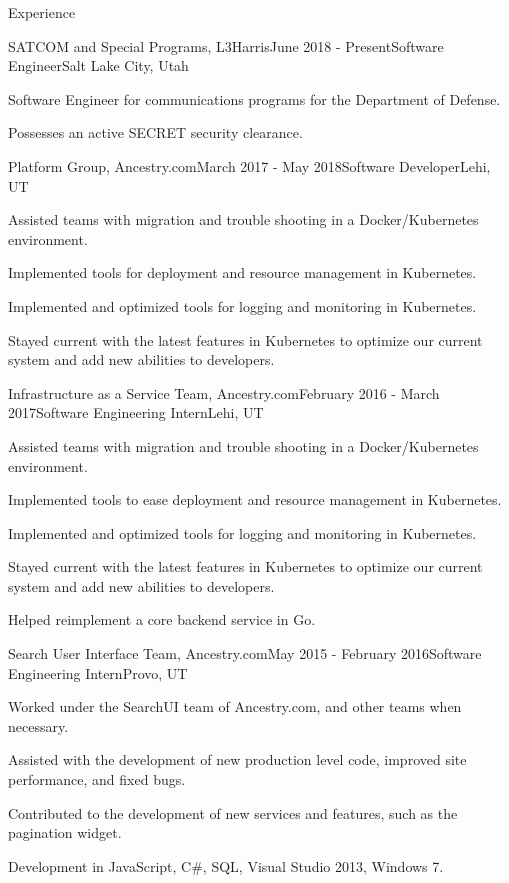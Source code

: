 \documentclass{resume} %
\begin{document}
\begin{rSection}{Experience}

  \begin{rSubsection}{SATCOM and Special Programs, L3Harris}{June 2018 - Present}{Software Engineer}{Salt Lake City, Utah}
  \item Software Engineer for communications programs for the Department of Defense.
  \item Possesses an active SECRET security clearance.
  \end{rSubsection}
  
  \begin{rSubsection}{Platform Group, Ancestry.com}{March 2017 - May 2018}{Software Developer}{Lehi, UT}
  \item Assisted teams with migration and trouble shooting in a Docker/Kubernetes environment.
  \item Implemented tools for deployment and resource management in Kubernetes.
  \item Implemented and optimized tools for logging and monitoring in Kubernetes.
  \item Stayed current with the latest features in Kubernetes to optimize our current system and add new abilities to developers. 
  \end{rSubsection}
  
  \begin{rSubsection}{Infrastructure as a Service Team, Ancestry.com}{February 2016 - March 2017}{Software Engineering Intern}{Lehi, UT}
  \item Assisted teams with migration and trouble shooting in a Docker/Kubernetes environment.
  \item Implemented tools to ease deployment and resource management in Kubernetes.
  \item Implemented and optimized tools for logging and monitoring in Kubernetes.
  \item Stayed current with the latest features in Kubernetes to optimize our current system and add new abilities to developers.
  \item Helped reimplement a core backend service in Go.
  \end{rSubsection}

  \begin{rSubsection}{Search User Interface Team, Ancestry.com}{May 2015 - February 2016}{Software Engineering Intern}{Provo, UT}
  \item Worked under the SearchUI team of Ancestry.com, and other teams when necessary.
  \item Assisted with the development of new production level code, improved site performance, and fixed bugs.
  \item Contributed to the development of new services and features, such as the pagination widget.
  \item Development in JavaScript, C\#, SQL, Visual Studio 2013, Windows 7.
  \end{rSubsection}


\end{rSection}
\end{document}
